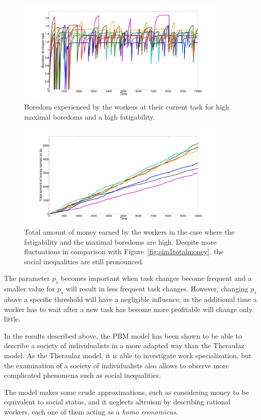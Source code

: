 \begin{figure}[h!]
	\centering
	\includegraphics[width=0.9\textwidth]{figures/moreboredom2.pdf}
	\caption{Boredom experienced by the workers at their current task for high maximal boredoms and a high fatigability.}
	\label{fig:moreboredom2}
\end{figure}

\begin{figure}[h!]
	\centering
	\includegraphics[width=0.9\textwidth]{figures/moreboredom3.pdf}
	\caption{Total amount of money earned by the workers in the case where the fatigability and the maximal boredoms are high. Despite more fluctuations in comparison with Figure~\ref{fig:sim1totalmoney}, the social inequalities are still pronounced.}
	\label{fig:moreboredom3}
\end{figure}

The parameter $p_s$ becomes important when task changes become frequent and a smaller value for $p_s$ will result in less frequent task changes. However, changing $p_s$ above a specific threshold will have a negligible influence, as the additional time a worker has to wait after a new task has become more profitable will change only little.

In the results described above, the PBM model has been shown to be able to describe a society of individualists in a more adapted way than the Theraulaz model. As the Theraulaz model, it is able to investigate work specialization, but the examination of a society of individualists also allows to observe more complicated phenomena such as social inequalities. 

The model makes some crude approximations, such as considering money to be equivalent to social status, and it neglects altruism by describing rational workers, each one of them acting as a \emph{homo economicus}.
